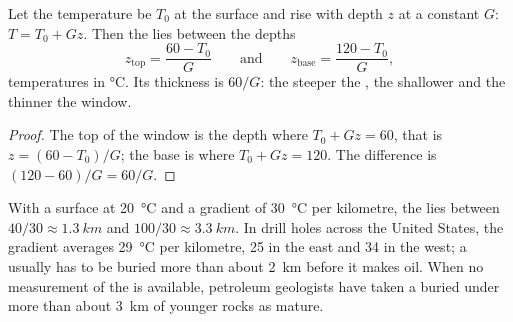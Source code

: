 \begin{proposition}\label{prop:g11:fossil-fuel-geology:window-depth}
Let the temperature be $T_0$ at the surface and rise with depth $z$ at a
constant  $G$: $T = T_0 + G z$. Then the  lies
between the depths
\[
  z_{\text{top}} = \frac{60 - T_0}{G}
  \qquad\text{and}\qquad
  z_{\text{base}} = \frac{120 - T_0}{G},
\]
temperatures in \unit{\degreeCelsius}. Its thickness is $60/G$: the
steeper the , the shallower and the thinner the window.
\end{proposition}

\begin{proof}
The top of the window is the depth where $T_0 + G z = 60$, that is
$z = (60 - T_0)/G$; the base is where $T_0 + G z = 120$. The difference is
$(120 - 60)/G = 60/G$.
\end{proof}

With a surface at \qty{20}{\degreeCelsius} and a gradient of
\qty{30}{\degreeCelsius} per kilometre, the  lies between
$40/30 \approx \qty{1.3}{km}$ and $100/30 \approx \qty{3.3}{km}$. In drill
holes across the United States, the gradient averages
\qty{29}{\degreeCelsius} per kilometre, \num{25} in the east and \num{34}
in the west; a  usually has to be buried more than about
\qty{2}{km} before it makes oil. When no measurement of the  is
available, petroleum geologists have taken a  buried under more
than about \qty{3}{km} of younger rocks as mature.

